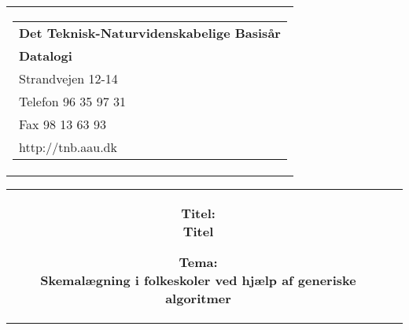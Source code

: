 \documentclass[12pt,hidelinks]{article}
\begin{document}
	\sloppy

	\begin{titlepage}
	\begin{nopagebreak}
	{\small\samepage 
	\hfill\begin{tabular}{r}
	\parbox{6cm}{  
	\hfill \parbox{4.9cm}{\begin{tabular}{l}
	{\sf\small \textbf{Det Teknisk-Naturvidenskabelige Basis{\aa}r }}\\
	{\sf\small  \textbf{Datalogi}} \\
	{\sf\small Strandvejen 12-14} \\
	{\sf\small Telefon 96 35 97 31} \\
	{\sf\small Fax 98 13 63 93} \\
	{\sf\small http://tnb.aau.dk}
	\end{tabular}}}
	\\
	\end{tabular}

	\begin{tabular}{cc}
	\parbox{7cm}{
	\begin{description}

	\item {\bf Titel: \\Titel} 
	  
	\item {\bf Tema: \\Skemalægning i folkeskoler ved hjælp af generiske algoritmer} 

	\end{description}

	\parbox{7cm}{

}}
\end{tabular}}
\end{nopagebreak}
\end{titlepage}
\end{document}
